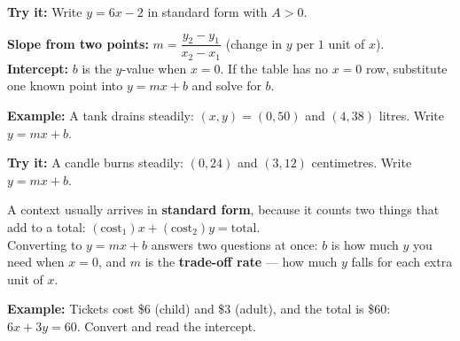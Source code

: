 \documentclass[12pt]{article}
\begin{document}
\begin{tryitbox}
\textbf{Try it:} \quad Write $y = 6x - 2$ in standard form with $A > 0$.\\[2pt]
\end{tryitbox}


\begin{formulabox}
\textbf{Slope from two points:} \quad $m = \dfrac{y_2 - y_1}{x_2 - x_1}$ (change in $y$ per
$1$ unit of $x$).\\[3pt]
\textbf{Intercept:} $b$ is the $y$-value when $x = 0$. If the table has no $x = 0$ row,
substitute one known point into $y = mx + b$ and solve for $b$.
\end{formulabox}

\begin{examplebox}
\textbf{Example:} \quad A tank drains steadily: $(x, y) = (0, 50)$ and $(4, 38)$ litres.
Write $y = mx + b$.
\end{examplebox}

\begin{tryitbox}
\textbf{Try it:} \quad A candle burns steadily: $(0, 24)$ and $(3, 12)$ centimetres.
Write $y = mx + b$.\\[2pt]
\end{tryitbox}


\begin{formulabox}
A context usually arrives in \textbf{standard form}, because it counts two things that add to
a total: $(\text{cost}_1)x + (\text{cost}_2)y = \text{total}$.\\[3pt]
Converting to $y = mx + b$ answers two questions at once: $b$ is how much $y$ you need when
$x = 0$, and $m$ is the \textbf{trade-off rate} --- how much $y$ falls for each extra unit of
$x$.
\end{formulabox}

\begin{examplebox}
\textbf{Example:} \quad Tickets cost \$6 (child) and \$3 (adult), and the total is \$60:
$6x + 3y = 60$. Convert and read the intercept.
\end{examplebox}
\end{document}

